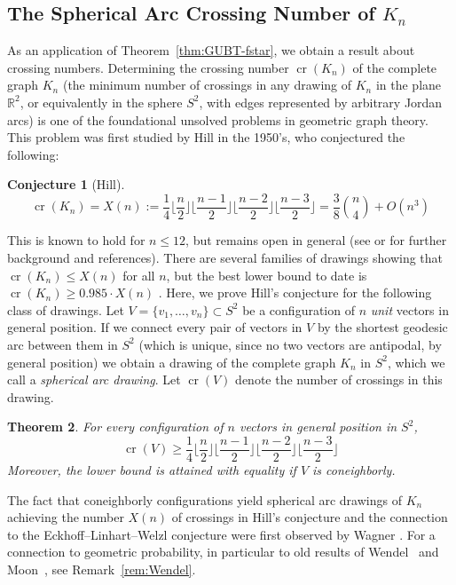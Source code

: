 \documentclass[11pt]{article}
\newtheorem{theorem}{Theorem}
\newtheorem{conjecture}[theorem]{Conjecture}
\DeclareMathOperator{\cross}{cr}
\renewcommand{\leq}{\leqslant}
\renewcommand{\geq}{\geqslant}
\newcommand{\R}{\mathbb{R}}
\begin{document}
\subsection{The Spherical Arc Crossing Number of $K_n$}
\label{subsec:crossing}
As an application of Theorem~\ref{thm:GUBT-fstar}, we obtain a result about crossing numbers. Determining the crossing number $\cross(K_n)$ of the complete graph $K_n$ (the minimum number of crossings in any drawing of $K_n$ in the plane $\R^2$, or equivalently in the sphere $S^2$, with edges represented by arbitrary Jordan arcs) is one of the foundational unsolved problems in geometric graph theory. This problem was first studied by Hill in the 1950's, who conjectured the following: 
\begin{conjecture}[Hill]
\begin{equation}
\label{conj:Hill}
\cross(K_n)=X(n):=\frac{1}{4}\Big\lfloor \frac{n}{2}\Big\rfloor \Big\lfloor \frac{n-1}{2} \Big\rfloor \Big\lfloor \frac{n-2}{2} \Big\rfloor \Big\lfloor \frac{n-3}{2}\Big\rfloor =\frac{3}{8}\binom{n}{4}+O(n^3)
\end{equation}
\end{conjecture}
This is known to hold for $n\leq 12$, but remains open in general (see \cite[Sec.~1.3]{Schaefer:2018aa} or \cite{Szekely:2016aa} for further background and references). There are several families of drawings showing that $\cross(K_n)\leq X(n)$ for all $n$, but the best lower bound to date is %
$\cross(K_n) \geq 0.985 \cdot X(n)$  \cite{Balogh:2019aa}.
%
Here, we prove Hill's conjecture for the following class of drawings. Let $V=\{v_1,\dots,v_n\} \subset S^2$ be a configuration of $n$ \emph{unit} vectors in general position. If we connect every pair of vectors in $V$ by the shortest geodesic arc between them in $S^2$ (which is unique, since no two vectors are antipodal, by general position) we obtain a drawing of the complete graph $K_n$ in $S^2$, which we call a \emph{spherical arc drawing}. Let 
$\cross(V)$ 
denote the number of crossings in this drawing.
\begin{theorem} 
\label{thm:crossings}
For every configuration of $n$ vectors in general position in $S^2$, 
\[\cross(V) \geq \frac{1}{4}\Big\lfloor \frac{n}{2}\Big\rfloor \Big\lfloor \frac{n-1}{2} \Big\rfloor \Big\lfloor \frac{n-2}{2} \Big\rfloor \Big\lfloor \frac{n-3}{2}\Big\rfloor
\]
Moreover, the lower bound is attained with equality if $V$ is coneighborly.
\end{theorem}
%
The fact that coneighborly configurations yield spherical arc drawings of $K_n$ achieving the number $X(n)$ of crossings in Hill's conjecture and the connection to the Eckhoff--Linhart--Welzl conjecture were first observed by Wagner \cite{Wagner:2006aa,Wagner:2008aa}. For a connection to geometric probability, in particular to old results of Wendel~\cite{Wendel:1962aa}  and Moon~\cite{Moon:1965aa}, see Remark~\ref{rem:Wendel}.
\end{document}
